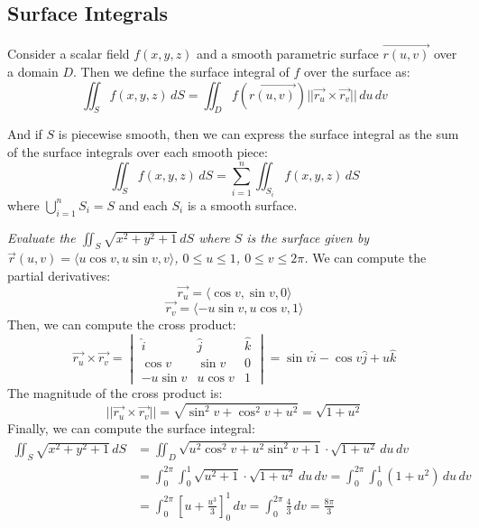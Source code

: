 \documentclass[11pt]{report}
\begin{document}
\subsection{Surface Integrals}
\begin{definition}
    Consider a scalar field \(f(x,y,z)\) and a smooth parametric surface \(\vec{r(u,v)}\) over a domain \(D\). Then we define the surface integral of \(f\) over the surface as:
    \begin{equation}
        \iint_S f(x,y,z) \, dS = \iint_D f(\vec{r(u,v)}) ||\vec{r_u} \times \vec{r_v}|| \, du \, dv
    \end{equation}

    And if $S$ is piecewise smooth, then we can express the surface integral as the sum of the surface integrals over each smooth piece:
    \begin{equation}
        \iint_S f(x,y,z) \, dS = \sum_{i=1}^n \iint_{S_i} f(x,y,z) \, dS
    \end{equation}
    where \( \bigcup_{i=1}^n S_i = S \) and each \(S_i\) is a smooth surface.
\end{definition}
\begin{example}
    \textit{Evaluate the $\iint_S \sqrt{x^2 + y^2 + 1} \, dS$ where \(S\) is the surface given by $\vec{r}(u,v) = \langle u\cos v, u\sin v, v \rangle$, $0 \leq u \leq 1$, $0 \leq v \leq 2\pi$.}   
    We can compute the partial derivatives:
    $$        \vec{r_u} = \langle \cos v, \sin v, 0 \rangle $$
    $$        \vec{r_v} = \langle -u \sin v, u \cos v, 1 \rangle $$
    Then, we can compute the cross product:
    $$        \vec{r_u} \times \vec{r_v} = 
        \begin{vmatrix}
            \hat{i} & \hat{j} & \hat{k} \\ 
            \cos v & \sin v & 0 \\ 
            -u \sin v & u \cos v & 1
        \end{vmatrix}
        = \sin v \hat{i} - \cos v \hat{j} + u \hat{k}
    $$
    The magnitude of the cross product is:
    $$        ||\vec{r_u} \times \vec{r_v}|| = \sqrt{\sin^2 v + \cos^2 v + u^2} = \sqrt{1 + u^2} $$
    Finally, we can compute the surface integral:
    \begin{align*}
        \iint_S \sqrt{x^2 + y^2 + 1} \, dS &= \iint_D \sqrt{u^2 \cos^2 v + u^2 \sin^2 v + 1} \cdot \sqrt{1 + u^2} \, du \, dv \\
        &= \int_0^{2\pi} \int_0^1 \sqrt{u^2 + 1} \cdot \sqrt{1 + u^2} \, du \, dv = \int_0^{2\pi} \int_0^1 (1 + u^2) \, du \, dv \\
        &= \int_0^{2\pi} \left[ u + \frac{u^3}{3} \right]_0^1 \, dv = \int_0^{2\pi} \frac{4}{3} \, dv = \frac{8\pi}{3}
    \end{align*}
\end{example}
\end{document}
